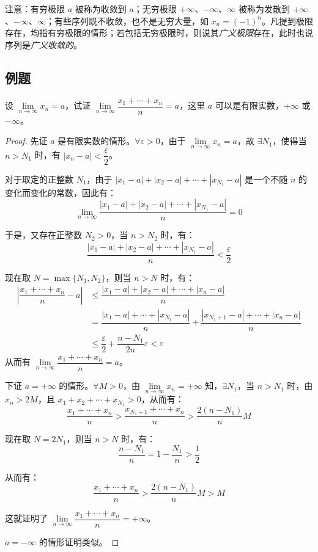 注意：有穷极限 $a$ 被称为收敛到 $a$；无穷极限 $+\infty$、$-\infty$、$\infty$ 被称为发散到 $+\infty$、$-\infty$、$\infty$；有些序列既不收敛，也不是无穷大量，如 $x_n = (-1)^n$。凡提到极限存在，均指有穷极限的情形；若包括无穷极限时，则说其\emph{广义极限}存在，此时也说序列是\emph{广义收敛的}。

\subsection{例题}

设 $\lim\limits_{n \rightarrow \infty} x_n = a$，试证 $\lim\limits_{n \rightarrow \infty} \dfrac{x_1 + \cdots + x_n}{n} = a$，这里 $a$ 可以是有限实数，$+\infty$ 或 $-\infty$。

\begin{proof}
	先证 $a$ 是有限实数的情形。$\forall \varepsilon > 0$，由于 $\lim\limits_{n \rightarrow \infty} x_n = a$，故 $\exists N_1$，使得当 $n > N_1$ 时，有 $|x_n - a| < \dfrac{\varepsilon}{2}$。

	对于取定的正整数 $N_1$，由于 $|x_1 - a| + |x_2 - a| + \cdots + |x_{N_1} - a|$ 是一个不随 $n$ 的变化而变化的常数，因此有：
	$$
	\lim\limits_{n \rightarrow \infty} \dfrac{|x_1 - a| + |x_2 - a| + \cdots + |x_{N_1} - a|}{n} = 0
	$$

	于是，又存在正整数 $N_2 > 0$，当 $n > N_2$ 时，有：
	$$
	\dfrac{|x_1 - a| + |x_2 - a| + \cdots + |x_{N_1} - a|}{n} < \dfrac{\varepsilon}{2}
	$$

	现在取 $N = \max\{N_1, N_2\}$，则当 $n > N$ 时，有：
	$$
	\begin{aligned}
		\left| \dfrac{x_1 + \cdots + x_n}{n} - a \right| &\le \dfrac{|x_1 - a| + |x_2 - a| + \cdots + |x_n - a|}{n}
		\\&=
		\dfrac{|x_1 - a| + \cdots + |x_{N_1} - a|}{n} + \dfrac{|x_{N_1 + 1} - a| + \cdots + |x_n - a|}{n}
		\\&\le
		\dfrac{\varepsilon}{2} + \dfrac{n - N_1}{2n} \varepsilon < \varepsilon
	\end{aligned}
	$$
	从而有 $\lim\limits_{n \rightarrow \infty} \dfrac{x_1 + \cdots + x_n}{n} = a$。

	下证 $a = +\infty$ 的情形。$\forall M > 0$，由 $\lim\limits_{n \rightarrow \infty} x_n = +\infty$ 知，$\exists N_1$，当 $n > N_1$ 时，由 $x_n > 2M$，且 $x_1 + x_2 + \cdots + x_{N_1} > 0$，从而有：
	$$
	\dfrac{x_1 + \cdots + x_n}{n} > \dfrac{x_{N_1 + 1} + \cdots + x_n}{n} > \dfrac{2(n - N_1)}{n} M
	$$

	现在取 $N = 2N_1$，则当 $n > N$ 时，有：
	$$
	\dfrac{n - N_1}{n} = 1 - \dfrac{N_1}{n} > \dfrac{1}{2}
	$$

	从而有：
	$$
	\dfrac{x_1 + \cdots + x_n}{n} > \dfrac{2(n - N_1)}{n} M > M
	$$

	这就证明了 $\lim\limits_{n \rightarrow \infty} \dfrac{x_1 + \cdots + x_n}{n} = +\infty$。

	$a = -\infty$ 的情形证明类似。
\end{proof}